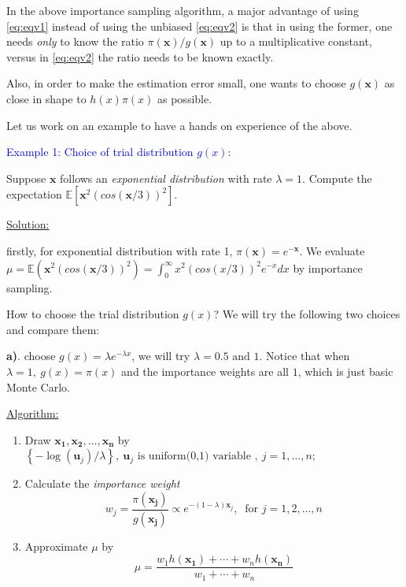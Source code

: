 \documentclass[12pt]{article}
\newcommand{\E}{\mathbb{E}}
\newcommand{\varx}{\mathbf{x}}
\newcommand{\brac}[1]{\left[#1\right]}
\newcommand{\set}[1]{\left\{#1\right\}}
\numberwithin{equation}{subsection}
\begin{document}
In the above importance sampling algorithm, a major advantage of using \eqref{eq:eqv1} instead of using the unbiased \eqref{eq:eqv2} is that in using the former, one needs \textit{only} to know the ratio $\pi(\mathbf{x})/g(\mathbf{x})$ up to a multiplicative constant, versus in \eqref{eq:eqv2} the ratio needs to be known exactly.

Also, in order to make the estimation error small, one wants to choose $g(\mathbf{x})$ as close in shape to $h(x)\pi(x)$ as possible. \newline

Let us work on an example to have a hands on experience of the above.\newline

\noindent
\textcolor{blue}{Example 1: Choice of trial distribution $g(x)$}:

Suppose $\varx$ follows an \textit{exponential distribution} with rate $\lambda = 1$. Compute the expectation $\E\brac{\varx^2(cos(\varx/3))^2}$.

\underline{Solution:}

firstly, for exponential distribution with rate 1, $\pi(\varx) = e^{-\varx}$. We evaluate $\mu = \E(\varx^2(cos(\varx/3))^2) = \int_0^{\infty}x^2(cos(x/3))^2e^{-x}dx$ by importance sampling.\newline

How to choose the trial distribution $g(x)$? We will try the following two choices and compare them:\newline

\textbf{a)}. choose $g(x)  = \lambda e^{-\lambda x}$, we will try $\lambda = 0.5 \text{ and } 1$. Notice that when $\lambda = 1,~g(x) = \pi(x)$ and the importance weights are all $1$, which is just basic Monte Carlo.

\underline{Algorithm:}
\begin{enumerate}[(1)]
\item Draw $\mathbf{x_1}, \mathbf{x_2}, \dots, \mathbf{x_n}$ by $\set{-\log(\mathbf{u}_j)/\lambda},~\mathbf{u}_j \text{ is uniform(0,1) variable },~j=1, \dots, n$;
\item Calculate the \textit{importance weight} $$w_j = \frac{\pi(\mathbf{x_j})}{g(\mathbf{x_j})} \propto e^{-(1-\lambda)\varx_j},~\text{ for } j = 1, 2, \dots, n$$
\item Approximate $\mu$ by 
$$\hat{\mu} = \frac{w_1h(\mathbf{x_1}) + \cdots + w_nh(\mathbf{x_n})}{w_1 + \cdots + w_n} $$
\end{enumerate}
\end{document}
